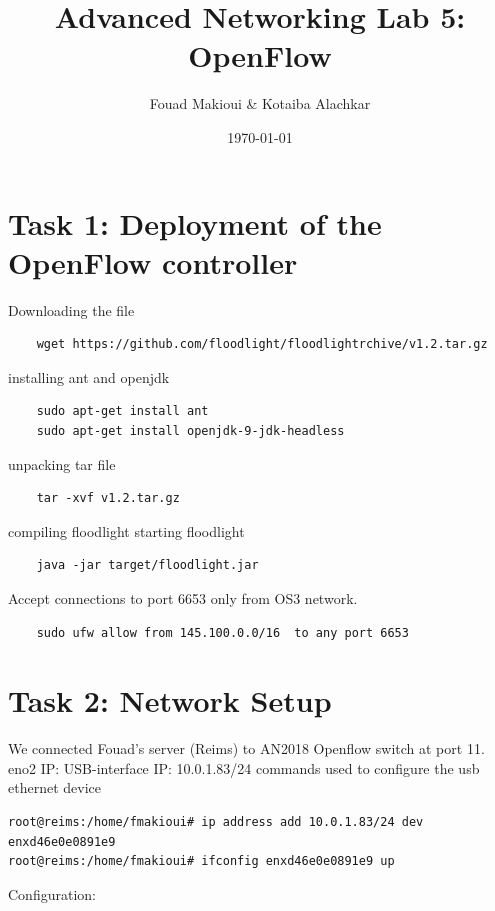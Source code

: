 \documentclass[a4paper]{article}
\title{Advanced Networking Lab 5: OpenFlow}
\author{Fouad Makioui \& Kotaiba Alachkar}
\date{\today}
\begin{document}
\maketitle


\section{Task 1: Deployment of the OpenFlow controller}
\label{sec:task1}

Downloading the file
\begin{verbatim}
    wget https://github.com/floodlight/floodlightrchive/v1.2.tar.gz
\end{verbatim}
installing ant and openjdk
\begin{verbatim}
    sudo apt-get install ant
    sudo apt-get install openjdk-9-jdk-headless
\end{verbatim}
unpacking tar file
\begin{verbatim}
    tar -xvf v1.2.tar.gz
\end{verbatim}
compiling floodlight
starting floodlight
\begin{verbatim}
    java -jar target/floodlight.jar
\end{verbatim}

Accept connections to port 6653 only from OS3 network.
\begin{verbatim}
    sudo ufw allow from 145.100.0.0/16  to any port 6653
\end{verbatim}





\section{Task 2: Network Setup}
\label{sec:task2}

We connected Fouad's server (Reims) to AN2018 Openflow switch at port 11.
eno2 IP: 
USB-interface IP: 10.0.1.83/24
commands used to configure the usb ethernet device
\begin{verbatim}
root@reims:/home/fmakioui# ip address add 10.0.1.83/24 dev enxd46e0e0891e9
root@reims:/home/fmakioui# ifconfig enxd46e0e0891e9 up
\end{verbatim}


Configuration:
\end{document}
